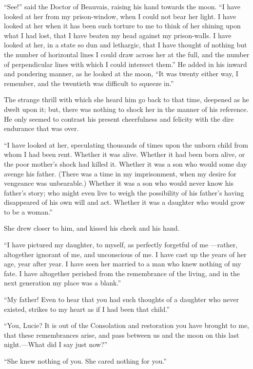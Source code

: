 ``See!'' said the Doctor of Beauvais, raising his hand towards the moon.
``I have looked at her from my prison-window, when I could not bear
her light.  I have looked at her when it has been such torture to me
to think of her shining upon what I had lost, that I have beaten my
head against my prison-walls.  I have looked at her, in a state so
dun and lethargic, that I have thought of nothing but the number of
horizontal lines I could draw across her at the full, and the number of
perpendicular lines with which I could intersect them.''  He added in his
inward and pondering manner, as he looked at the moon, ``It was twenty
either way, I remember, and the twentieth was difficult to squeeze in.''

The strange thrill with which she heard him go back to that time,
deepened as he dwelt upon it; but, there was nothing to shock her in
the manner of his reference.  He only seemed to contrast his present
cheerfulness and felicity with the dire endurance that was over.

``I have looked at her, speculating thousands of times upon the unborn
child from whom I had been rent.  Whether it was alive.  Whether it had
been born alive, or the poor mother's shock had killed it.  Whether it
was a son who would some day avenge his father. (There was a time in my
imprisonment, when my desire for vengeance was unbearable.)  Whether it
was a son who would never know his father's story; who might even live
to weigh the possibility of his father's having disappeared of his own
will and act.  Whether it was a daughter who would grow to be a woman.''

She drew closer to him, and kissed his cheek and his hand.

``I have pictured my daughter, to myself, as perfectly forgetful of me%
---rather, altogether ignorant of me, and unconscious of me.  I have
cast up the years of her age, year after year.  I have seen her married
to a man who knew nothing of my fate.  I have altogether perished from
the remembrance of the living, and in the next generation my place
was a blank.''

``My father!  Even to hear that you had such thoughts of a daughter
who never existed, strikes to my heart as if I had been that child.''

``You, Lucie?  It is out of the Consolation and restoration you have
brought to me, that these remembrances arise, and pass between us and
the moon on this last night.---What did I say just now?''

``She knew nothing of you.  She cared nothing for you.''

